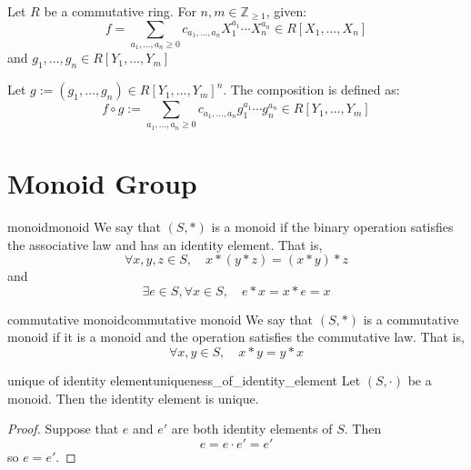 \begin{definition}
  Let $R$ be a commutative ring. For $n,m \in \mathbb{Z}_{\geq 1}$, given:
  \[
    f = \sum_{a_1,\ldots,a_n \geq 0} c_{a_1,\ldots,a_n} X_1^{a_1}\cdots X_n^{a_n} \in R[X_1,\ldots,X_n]
  \]
  and $g_1,\ldots,g_n \in R[Y_1,\ldots,Y_m]$

  Let $g := (g_1,\ldots,g_n) \in R[Y_1,\ldots,Y_m]^n$. The composition is defined as:
  \[
    f \circ g := \sum_{a_1,\ldots,a_n \geq 0} c_{a_1,\ldots,a_n} g_1^{a_1}\cdots g_n^{a_n} \in R[Y_1,\ldots,Y_m]
  \]
\end{definition}

\section{Monoid Group}

\begin{definition}{monoid}{monoid}
  We say that $(S, \ast)$ is a monoid if the binary operation satisfies the associative law and has an identity element. That is,
  \[
    \forall x, y, z \in S, \quad x \ast (y \ast z) = (x \ast y) \ast z
  \]
  and
  \[
    \exists e \in S, \forall x \in S, \quad e \ast x = x \ast e = x
  \]
\end{definition}

\begin{definition}{commutative monoid}{commutative monoid}
  We say that $(S, \ast)$ is a commutative monoid if it is a monoid and the operation satisfies the commutative law. That is,
  \[
    \forall x, y \in S, \quad x \ast y = y \ast x
  \]
\end{definition}

\begin{proposition}{unique of identity element}{uniqueness_of_identity_element}
  Let $(S, \cdot)$ be a monoid. Then the identity element is unique.
\end{proposition}
\begin{proof}
  Suppose that $e$ and $e'$ are both identity elements of $S$. Then
  \[
    e = e \cdot e' = e'
  \]
  so $e = e'$.
\end{proof}

